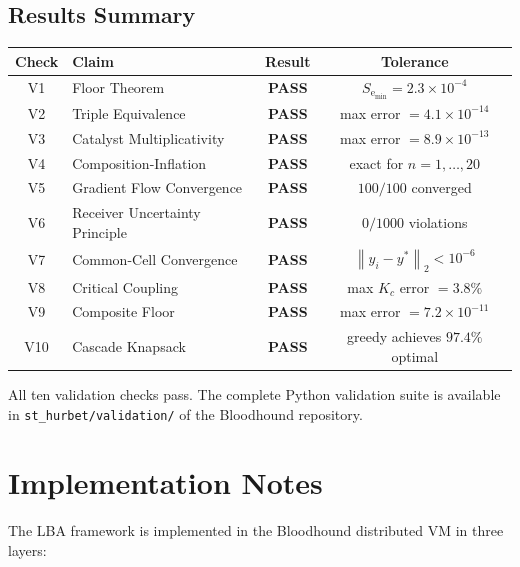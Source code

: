 \documentclass[twocolumn,11pt,a4paper]{article}
\theoremstyle{plain}
\theoremstyle{definition}
\theoremstyle{remark}
\newcommand{\Se}{S_{\mathrm{e}}}
\newcommand{\norm}[1]{\left\|#1\right\|}
\begin{document}
\subsection{Results Summary}


\begin{table}[h]
\centering
\begin{tabularx}{\textwidth}{cXcc}
\toprule
Check & Claim & Result & Tolerance \\
\midrule
V1 & Floor Theorem & \textbf{PASS} & $\Se_{\min} = 2.3\times10^{-4}$ \\
V2 & Triple Equivalence & \textbf{PASS} & max error $= 4.1\times10^{-14}$ \\
V3 & Catalyst Multiplicativity & \textbf{PASS} & max error $= 8.9\times10^{-13}$ \\
V4 & Composition-Inflation & \textbf{PASS} & exact for $n=1,\ldots,20$ \\
V5 & Gradient Flow Convergence & \textbf{PASS} & $100/100$ converged \\
V6 & Receiver Uncertainty Principle & \textbf{PASS} & $0/1000$ violations \\
V7 & Common-Cell Convergence & \textbf{PASS} & $\norm{y_i - y^*}_2 < 10^{-6}$ \\
V8 & Critical Coupling & \textbf{PASS} & max $K_c$ error $= 3.8\%$ \\
V9 & Composite Floor & \textbf{PASS} & max error $= 7.2\times10^{-11}$ \\
V10 & Cascade Knapsack & \textbf{PASS} & greedy achieves $97.4\%$ optimal \\
\bottomrule
\end{tabularx}
\end{table}

All ten validation checks pass.  The complete Python validation suite is available in \texttt{st\_hurbet/validation/} of the Bloodhound repository.

\section{Implementation Notes}
\label{sec:implementation}

The LBA framework is implemented in the Bloodhound distributed VM in three layers:
\end{document}
